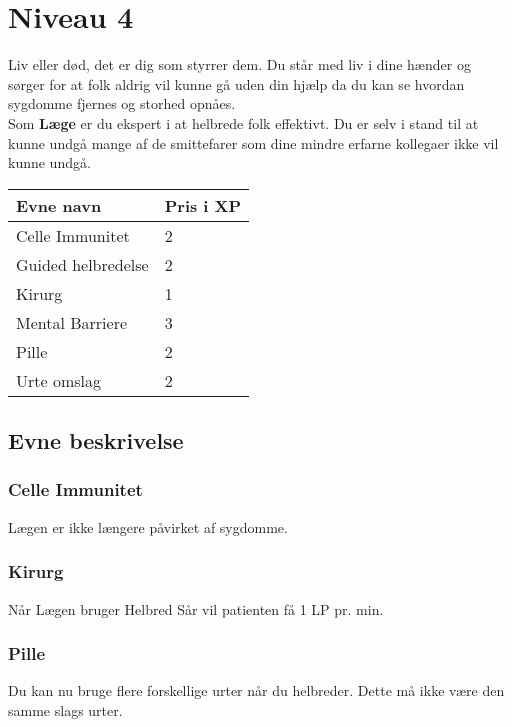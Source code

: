 \chapter{Niveau 4}
Liv eller død, det er dig som styrrer dem. Du står med liv i dine hænder og sørger for at folk aldrig vil kunne gå uden din hjælp da du kan se hvordan sygdomme fjernes og storhed opnåes.\\
Som \textbf{Læge} er du ekspert i at helbrede folk effektivt. Du er selv i stand til at kunne undgå mange af de smittefarer som dine mindre erfarne kollegaer ikke vil kunne undgå.\\ 


\begin{table}[H]
    \centering
    \begin{tabular}{|p{}|p{}|}
    \rowcolor{cerulean!80}\hline
        Evne navn & Pris i XP \\\hline
        Celle Immunitet & 2\\\hline
        Guided helbredelse & 2\\\hline
        Kirurg & 1 \\\hline
        Mental Barriere & 3\\\hline
        Pille & 2 \\\hline
        Urte omslag & 2 \\\hline
    \end{tabular}
\end{table}

\section{Evne beskrivelse}
\subsection{Celle Immunitet}
Lægen er ikke længere påvirket af sygdomme.

\subsection{Kirurg}
Når Lægen bruger Helbred Sår vil patienten få 1 LP pr. min.

\subsection{Pille}
Du kan nu bruge flere forskellige urter når du helbreder. Dette må ikke være den samme slags urter.

